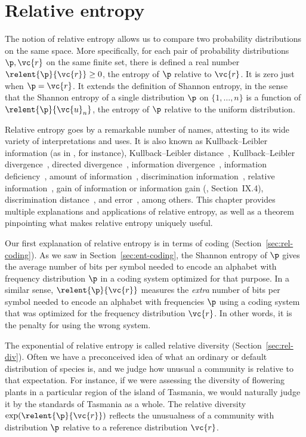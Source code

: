 \chapter{Relative entropy}

The notion of relative entropy allows us to compare two probability
distributions on the same space.  More specifically, for each pair of
probability distributions $\p, \vc{r}$ on the same finite set, there is
defined a real number $\relent{\p}{\vc{r}} \geq 0$, the entropy of $\p$
relative to $\vc{r}$.  It is zero just when $\p = \vc{r}$.  It extends the
definition of Shannon entropy, in the sense that the Shannon entropy of a
single distribution $\p$ on $\{1, \ldots, n\}$ is a function of
$\relent{\p}{\vc{u}_n}$, the entropy of $\p$ relative to the uniform
distribution.

Relative entropy goes by a remarkable number of names,%
%
%
attesting to its wide variety of interpretations and uses.  It is also
known as Kullback--Leibler information (as in \cite{ScheTS}, for instance),
Kullback--Leibler distance~\cite{CoTh1}, Kullback--Leibler
divergence~\cite{Joyc}, directed divergence~\cite{KullITS}, information
divergence~\cite{GrNi}, information deficiency~\cite{BJTV}, amount of
information~\cite{Reny}, discrimination information~\cite{KullKLD},
relative information~\cite{TaKu}, gain of information or information gain
(\cite{RenyPT}, Section~IX.4), discrimination distance~\cite{KantDDB}, and
error~\cite{Kerr}, among others.  This chapter provides multiple
explanations and applications of relative entropy, as well as a theorem
pinpointing what makes relative entropy uniquely useful.

Our first explanation of relative entropy is in terms of coding
(Section~\ref{sec:rel-coding}).  As we saw in Section~\ref{sec:ent-coding},
the Shannon entropy of $\p$ gives the average number of bits per
symbol needed to encode an alphabet with frequency distribution $\p$ in a
coding system optimized for that purpose.  In a similar sense,
$\relent{\p}{\vc{r}}$ measures the \emph{extra} number of bits per symbol
needed to encode an alphabet with frequencies $\p$ using a coding system
that was optimized for the frequency distribution $\vc{r}$.  In other
words, it is the penalty for using the wrong system.

The exponential of relative entropy is called relative diversity
(Section~\ref{sec:rel-div}).  Often we have a preconceived idea of what
an ordinary or default distribution of species is, and we judge how unusual
a community is relative to that expectation.  For instance, if we were
assessing the diversity of flowering plants in a particular region of
the island of Tasmania, we would naturally judge it by the standards of
Tasmania as a whole.  The relative diversity $\exp(\relent{\p}{\vc{r}})$
reflects the unusualness of a community with distribution $\p$ relative to
a reference distribution $\vc{r}$.


